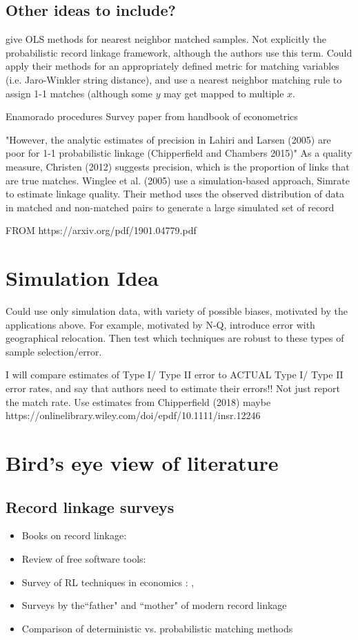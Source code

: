 \documentclass[12pt]{article}
\begin{document}
\subsection{Other ideas to include?}
\cite{hirukawa2018} give OLS methods for nearest neighbor matched samples.  Not explicitly the probabilistic record linkage framework, although the authors use this term. Could apply their methods for an appropriately defined metric for matching variables (i.e. Jaro-Winkler string distance), and use a nearest neighbor matching rule to assign 1-1 matches (although some $y$ may get mapped to multiple $x$. 


 Enamorado procedures
 Survey paper from handbook of econometrics
 
 "However, the analytic estimates of precision in Lahiri
and Larsen (2005) are poor for 1-1 probabilistic linkage (Chipperfield and Chambers
2015)"   As a quality measure, Christen (2012) suggests precision, which is the proportion of
links that are true matches. Winglee et al. (2005) use a simulation-based approach,
Simrate to estimate linkage quality. Their method uses the observed distribution of
data in matched and non-matched pairs to generate a large simulated set of record 

FROM https://arxiv.org/pdf/1901.04779.pdf
 

\section*{Simulation Idea}
Could use only simulation data, with variety of possible biases, motivated by the applications above.  For example, motivated by  N-Q, introduce error with geographical relocation.  Then test which techniques are robust to these types of sample selection/error.   

I will compare estimates of Type I/ Type II error to ACTUAL Type I/ Type II error rates, and say that authors need to estimate their errors!! Not just report the match rate.   Use estimates from Chipperfield (2018) maybe https://onlinelibrary.wiley.com/doi/epdf/10.1111/insr.12246

\newpage
\singlespacing
\section{Bird's eye view of literature}
\subsection*{Record linkage surveys}
\begin{itemize}
\item Books on record linkage: \cite{christen2012, herzog07, harron_book}
\item Review of free software tools: \cite{kopcke2010}
\item Survey of RL techniques in economics : \cite{bailey2017}, \cite{abe2019} 
\item Surveys by the``father" and ``mother" of modern record linkage \citep{winkler99} 
\item Comparison of deterministic vs. probabilistic matching methods \citep{harron2018}
\end{itemize}
\end{document}

